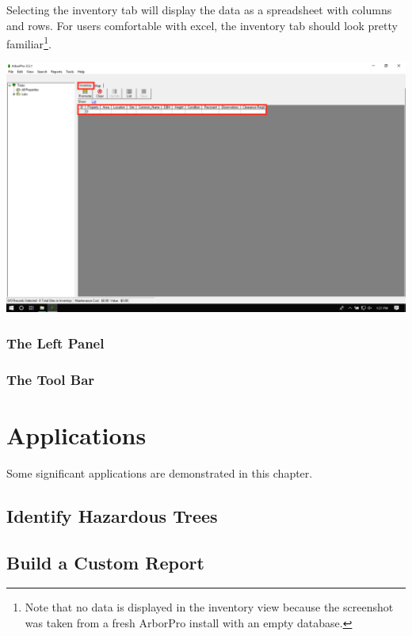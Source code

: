 \documentclass[]{book}
\let\rmarkdownfootnote\footnote%
\def\footnote{\protect\rmarkdownfootnote}
\begin{document}
Selecting the inventory tab will display the data as a spreadsheet with
columns and rows. For users comfortable with excel, the inventory tab
should look pretty familiar\footnote{Note that no data is displayed in
  the inventory view because the screenshot was taken from a fresh
  ArborPro install with an empty database.}.

\includegraphics[width=40in]{images/inventory-tab}

\hypertarget{the-left-panel}{%
\subsection{The Left Panel}\label{the-left-panel}}

\hypertarget{the-tool-bar}{%
\subsection{The Tool Bar}\label{the-tool-bar}}

\hypertarget{applications}{%
\chapter{Applications}\label{applications}}

Some significant applications are demonstrated in this chapter.

\hypertarget{identify-hazardous-trees}{%
\section{Identify Hazardous Trees}\label{identify-hazardous-trees}}

\hypertarget{build-a-custom-report}{%
\section{Build a Custom Report}\label{build-a-custom-report}}
\end{document}
